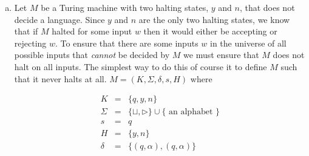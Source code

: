 \documentclass{article}
\newcommand{\EQ}{& = &}
\begin{document}
\begin{enumerate}[(a)]
\item Let $M$ be a Turing machine with two halting states, $y$ and $n$,
that does not decide a language.  Since $y$ and $n$ are the only two
halting states, we know that if $M$ halted for some input $w$ then
it would either be accepting or rejecting $w$.  To ensure that there are
some inputs $w$ in the universe of all possible inputs that \emph{cannot}
be decided by $M$ we must ensure that $M$ does not halt on all inputs.
The simplest way to do this of course it to define $M$ such that it never
halts at all.  $M = (K, \Sigma, \delta, s, H)$ where

\begin{eqnarray*}
K \EQ \{q, y, n\} \\
\Sigma \EQ \{\sqcup, \rhd\}\cup\{\text{ an alphabet }\} \\
s \EQ q \\
H \EQ \{y, n\} \\
\delta \EQ \{(q,\alpha), (q,\alpha)\} \\
\end{eqnarray*}

\end{enumerate}
\end{document}

